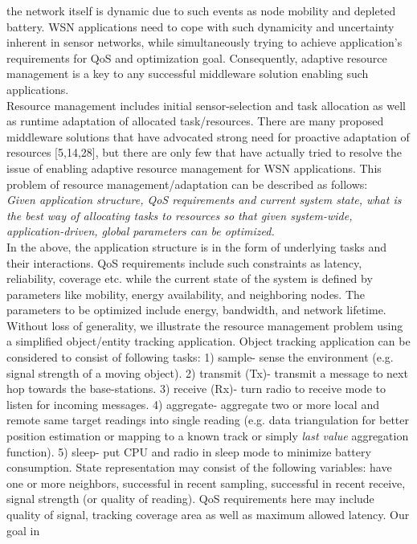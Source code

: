 the network itself is dynamic due to such events as
node mobility and depleted battery. WSN
applications need to cope with such dynamicity and
uncertainty inherent in sensor networks, while
simultaneously trying to achieve application's
requirements for QoS and optimization goal.
Consequently, adaptive resource management is a key
to any successful middleware
solution enabling such applications.\\ 
Resource management includes initial
sensor-selection and task allocation as well as
runtime adaptation of allocated task/resources.
There are many proposed middleware solutions that
have advocated strong need for proactive adaptation
of resources [5,14,28], but there are only few that
have actually tried to resolve the issue of
enabling adaptive resource management for WSN
applications. This problem of resource
management/adaptation can be described as follows:
\\ \emph{Given application structure, QoS
requirements and current system state, what is the
best way of allocating tasks to resources so that 
given system-wide, application-driven, global
parameters can be optimized.}\\ In the above, the
application structure is in the form of underlying
tasks and their interactions. QoS requirements
include such constraints as latency, reliability,
coverage etc. while the current state of the system
is defined by parameters like mobility, energy
availability, and neighboring nodes. The parameters
to be optimized include energy, bandwidth, and
network lifetime. Without loss of generality, we
illustrate the resource management problem using a
simplified object/entity tracking application.
Object tracking application can be considered to
consist of following tasks: 1) sample- sense the
environment (e.g. signal strength of a moving
object). 2) transmit (Tx)- transmit a message to
next hop towards the base-stations. 3) receive
(Rx)- turn radio to receive mode to listen for
incoming messages. 4) aggregate- aggregate two or
more local and remote same target readings into
single reading (e.g. data triangulation for better
position estimation or mapping to a known track or
simply \emph{last value} aggregation function). 5)
sleep- put CPU and radio in sleep mode to minimize
battery consumption. State representation may
consist of the following variables: have one or
more neighbors, successful in recent sampling,
successful in recent receive, signal strength (or
quality of reading). QoS requirements here may
include quality of signal, tracking coverage area
as well as maximum allowed latency. Our goal in
